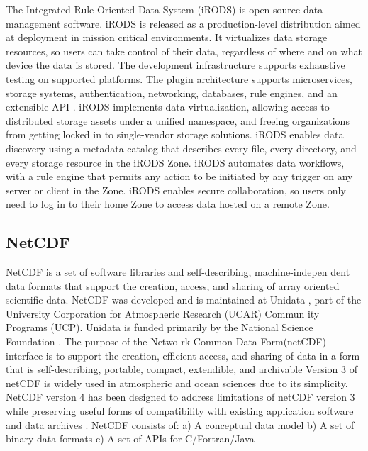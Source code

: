      The Integrated Rule-Oriented Data System (iRODS) is open source
     data management software. iRODS is released as a production-level
     distribution aimed at deployment in mission critical
     environments. It virtualizes data storage resources, so users can
     take control of their data, regardless of where and on what
     device the data is stored. The development infrastructure
     supports exhaustive testing on supported platforms. The plugin
     architecture supports microservices, storage systems,
     authentication, networking, databases, rule engines, and an
     extensible API \cite{irods-www}.  iRODS implements data
     virtualization, allowing access to distributed storage assets
     under a unified namespace, and freeing organizations from getting
     locked in to single-vendor storage solutions. iRODS enables data
     discovery using a metadata catalog that describes every file,
     every directory, and every storage resource in the iRODS
     Zone. iRODS automates data workflows, with a rule engine that
     permits any action to be initiated by any trigger on any server
     or client in the Zone. iRODS enables secure collaboration, so
     users only need to log in to their home Zone to access data
     hosted on a remote Zone. \cite{github-irods-www}


\subsection{NetCDF}

NetCDF is a set of software libraries and self-describing,
machine-indepen dent data formats that support the creation, access,
and sharing of array oriented scientific data. NetCDF was developed
and is maintained at Unidata , part of the University Corporation for
Atmospheric Research (UCAR) Commun ity Programs (UCP). Unidata is
funded primarily by the National Science Foundation
\cite{paper-netCDF} \cite{www-netcdf} . The purpose of the Netwo rk
Common Data Form(netCDF) interface is to support the creation,
efficient access, and sharing of data in a form that is
self-describing, portable, compact, extendible, and archivable Version
3 of netCDF is widely used in atmospheric and ocean sciences due to
its simplicity. NetCDF version 4 has been designed to address
limitations of netCDF version 3 while preserving useful forms of
compatibility with existing application software and data archives
\cite{paper-netCDF}.  NetCDF consists of: a) A conceptual data model
b) A set of binary data formats c) A set of APIs for C/Fortran/Java

